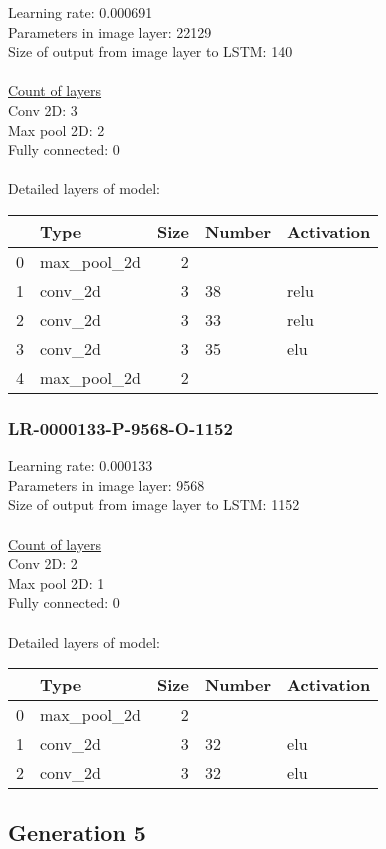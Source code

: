 Learning rate: 0.000691
\\Parameters in image layer: 22129
\\Size of output from image layer to LSTM: 140
\\\\\underline{Count of layers} 
\\Conv 2D:           3\\Max pool 2D:      2\\Fully connected:  0
\\\\Detailed layers of model: \\\begin{tabular}{rlrll}
\hline
    & Type        &   Size & Number   & Activation   \\
\hline
  0 & max\_pool\_2d &      2 &          &              \\
  1 & conv\_2d     &      3 & 38       & relu         \\
  2 & conv\_2d     &      3 & 33       & relu         \\
  3 & conv\_2d     &      3 & 35       & elu          \\
  4 & max\_pool\_2d &      2 &          &              \\
\hline
\end{tabular}\subsubsection*{LR-0000133-P-9568-O-1152}
Learning rate: 0.000133
\\Parameters in image layer: 9568
\\Size of output from image layer to LSTM: 1152
\\\\\underline{Count of layers} 
\\Conv 2D:           2\\Max pool 2D:      1\\Fully connected:  0
\\\\Detailed layers of model: \\\begin{tabular}{rlrll}
\hline
    & Type        &   Size & Number   & Activation   \\
\hline
  0 & max\_pool\_2d &      2 &          &              \\
  1 & conv\_2d     &      3 & 32       & elu          \\
  2 & conv\_2d     &      3 & 32       & elu          \\
\hline
\end{tabular}\subsection{Generation 5}
